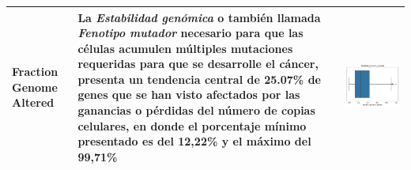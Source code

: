 \begin{table}[!htb]
\begin{threeparttable}
\begin{tabular}{p{2.5cm} p{7cm} p{6.5cm}}
			Fraction Genome Altered
			& La \textit{Estabilidad genómica} o también llamada \textit{Fenotipo mutador} necesario para que las células acumulen múltiples mutaciones requeridas para que se desarrolle el cáncer, presenta un tendencia central de 25.07\% de genes que se han visto afectados por las ganancias o pérdidas del número de copias celulares, en donde el porcentaje mínimo presentado es del 12,22\% y el máximo del 99,71\%
			
			& \begin{center}\includegraphics[width=1\linewidth]{NOTEBOOK/IMAGENES_DESCRIPTIVAS/17_fraction_genome_altered}\end{center}
			\\ \hline
			

\end{tabular}
\end{threeparttable}
\end{table}
